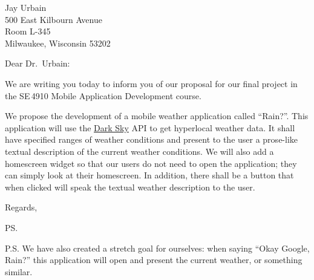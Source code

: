 \documentclass[letterpaper]{letter}
\date{4 November 2016}
\begin{document}
\begin{letter}{%
  Jay Urbain\\
  500 East Kilbourn Avenue\\
  Room L-345\\
  Milwaukee, Wisconsin 53202}

  \opening{Dear Dr.~Urbain:}

  We are writing you today to inform you of our proposal for our final project in the  SE\,4910 Mobile Application Development course.

  We propose the development of a mobile weather application called ``Rain?''.
  This application will use the \href{https://darksky.net}{Dark Sky} API to get hyperlocal weather data.
  It shall have specified ranges of weather conditions and present to the user a prose-like textual description of the current weather conditions.
  We will also add a homescreen widget so that our users do not need to open the application; they can simply look at their homescreen.
  In addition, there shall be a button that when clicked will speak the textual weather description to the user.

  \closing{Regards,}

  \ps

  P.S. We have also created a stretch goal for ourselves: when saying ``Okay Google, Rain?'' this application will open and present the current weather, or something similar.

\end{letter}
\end{document}
